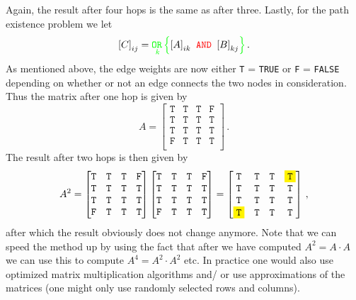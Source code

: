 Again, the result after four hops is the same as after three.  Lastly,
for the path existence problem we let
\begin{equation*}
  {[C]}_{ij} = {\color{green}
    \underset{k}{\texttt{OR}\,}
  }
  {\color{green}\Big\{}
  {[A]}_{ik} {\color{red}\texttt{ AND }} {[B]}_{kj}
  {\color{green}\Big\}}\,.
\end{equation*}
As mentioned above, the edge weights are now either \texttt{T} =
\texttt{TRUE} or \texttt{F} = \texttt{FALSE} depending on whether or
not an edge connects the two nodes in consideration. Thus the matrix
after one hop is given by \newcommand{\TRUE}{\mathtt{T}}
\newcommand{\FALSE}{\mathtt{F}}
\begin{equation*}
  A=
  \begin{bmatrix}
    \TRUE & \TRUE & \TRUE & \FALSE \\
    \TRUE & \TRUE & \TRUE & \TRUE \\
    \TRUE & \TRUE & \TRUE & \TRUE \\
    \FALSE & \TRUE & \TRUE & \TRUE \\
  \end{bmatrix}\,.
\end{equation*}
The result after two hops is then given by
\begin{equation*}
  A^2 =
  \begin{bmatrix}
    \TRUE & \TRUE & \TRUE & \FALSE \\
    \TRUE & \TRUE & \TRUE & \TRUE \\
    \TRUE & \TRUE & \TRUE & \TRUE \\
    \FALSE & \TRUE & \TRUE & \TRUE \\
  \end{bmatrix}
  \begin{bmatrix}
    \TRUE & \TRUE & \TRUE & \FALSE \\
    \TRUE & \TRUE & \TRUE & \TRUE \\
    \TRUE & \TRUE & \TRUE & \TRUE \\
    \FALSE & \TRUE & \TRUE & \TRUE \\
  \end{bmatrix}
  =
  \begin{bmatrix}
    \TRUE & \TRUE & \TRUE & \colorbox{yellow}{\texttt{T}} \\
    \TRUE & \TRUE & \TRUE & \TRUE \\
    \TRUE & \TRUE & \TRUE & \TRUE \\
    \colorbox{yellow}{\texttt{T}} & \TRUE & \TRUE & \TRUE \\
  \end{bmatrix}\,,
\end{equation*}
after which the result obviously does not change anymore. Note that we
can speed the method up by using the fact that after we have computed
$A^2 = A \cdot A$ we can use this to compute $A^4 = A^2 \cdot A^2$
etc. In practice one would also use optimized matrix multiplication
algorithms and/ or use approximations of the matrices (\eg one might
only use randomly selected rows and columns).

